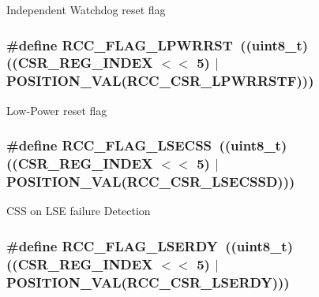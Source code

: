 Independent Watchdog reset flag \hypertarget{group___r_c_c___flag_ga67049531354aed7546971163d02c9920}{
\subsubsection[{R\-C\-C\-\_\-\-F\-L\-A\-G\-\_\-\-L\-P\-W\-R\-R\-S\-T}]{\setlength{\rightskip}{0pt plus 5cm}\#define R\-C\-C\-\_\-\-F\-L\-A\-G\-\_\-\-L\-P\-W\-R\-R\-S\-T~((uint8\-\_\-t)((C\-S\-R\-\_\-\-R\-E\-G\-\_\-\-I\-N\-D\-E\-X $<$$<$ 5) $\vert$ P\-O\-S\-I\-T\-I\-O\-N\-\_\-\-V\-A\-L({\bf R\-C\-C\-\_\-\-C\-S\-R\-\_\-\-L\-P\-W\-R\-R\-S\-T\-F})))}}\label{group___r_c_c___flag_ga67049531354aed7546971163d02c9920}
Low-\/\-Power reset flag \hypertarget{group___r_c_c___flag_ga7b25cf4df6fbb729b0d3f1530e5f6576}{
\subsubsection[{R\-C\-C\-\_\-\-F\-L\-A\-G\-\_\-\-L\-S\-E\-C\-S\-S}]{\setlength{\rightskip}{0pt plus 5cm}\#define R\-C\-C\-\_\-\-F\-L\-A\-G\-\_\-\-L\-S\-E\-C\-S\-S~((uint8\-\_\-t)((C\-S\-R\-\_\-\-R\-E\-G\-\_\-\-I\-N\-D\-E\-X $<$$<$ 5) $\vert$ P\-O\-S\-I\-T\-I\-O\-N\-\_\-\-V\-A\-L({\bf R\-C\-C\-\_\-\-C\-S\-R\-\_\-\-L\-S\-E\-C\-S\-S\-D})))}}\label{group___r_c_c___flag_ga7b25cf4df6fbb729b0d3f1530e5f6576}
C\-S\-S on L\-S\-E failure Detection \hypertarget{group___r_c_c___flag_gac9fb963db446c16e46a18908f7fe1927}{
\subsubsection[{R\-C\-C\-\_\-\-F\-L\-A\-G\-\_\-\-L\-S\-E\-R\-D\-Y}]{\setlength{\rightskip}{0pt plus 5cm}\#define R\-C\-C\-\_\-\-F\-L\-A\-G\-\_\-\-L\-S\-E\-R\-D\-Y~((uint8\-\_\-t)((C\-S\-R\-\_\-\-R\-E\-G\-\_\-\-I\-N\-D\-E\-X $<$$<$ 5) $\vert$ P\-O\-S\-I\-T\-I\-O\-N\-\_\-\-V\-A\-L({\bf R\-C\-C\-\_\-\-C\-S\-R\-\_\-\-L\-S\-E\-R\-D\-Y})))}}\label{group___r_c_c___flag_gac9fb963db446c16e46a18908f7fe1927}
